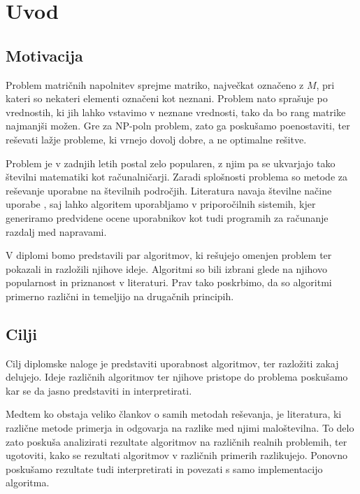 \chapter{Uvod}
\section{Motivacija}
Problem matričnih napolnitev sprejme matriko, največkat označeno z $M$, pri kateri so nekateri elementi označeni kot neznani. Problem nato sprašuje po vrednostih, ki jih lahko vstavimo v neznane vrednosti, tako da bo rang matrike najmanjši možen. Gre za NP-poln problem, zato ga poskušamo poenostaviti, ter reševati lažje probleme, ki vrnejo dovolj dobre, a ne optimalne rešitve. 

Problem je v zadnjih letih postal zelo popularen, z njim pa se ukvarjajo tako številni matematiki kot računalničarji. Zaradi splošnosti problema so metode za reševanje uporabne na številnih področjih. Literatura navaja številne načine uporabe \cite{Survey-NKS19}, saj lahko algoritem uporabljamo v priporočilnih sistemih, kjer generiramo predvidene ocene uporabnikov kot tudi programih za računanje razdalj med napravami. 


V diplomi bomo predstavili par algoritmov, ki rešujejo omenjen problem ter pokazali in razložili njihove ideje. Algoritmi so bili izbrani glede na njihovo popularnost in priznanost v literaturi. Prav tako poskrbimo, da so algoritmi primerno različni in temeljijo na drugačnih principih.

\section{Cilji}
Cilj diplomske naloge je predstaviti uporabnost algoritmov, ter razložiti zakaj delujejo. Ideje različnih algoritmov ter njihove pristope do problema poskušamo kar se da jasno predstaviti in interpretirati.

Medtem ko obstaja veliko člankov o samih metodah reševanja, je literatura, ki različne metode primerja in odgovarja na razlike med njimi maloštevilna. To delo zato poskuša analizirati rezultate algoritmov na različnih realnih problemih, ter ugotoviti, kako se rezultati algoritmov v različnih primerih razlikujejo. Ponovno poskušamo rezultate tudi interpretirati in povezati s samo implementacijo algoritma.

